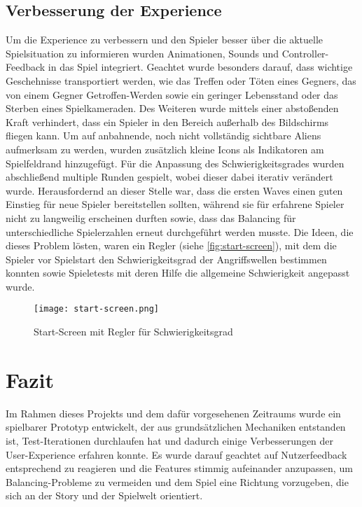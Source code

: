 \documentclass[11pt]{scrartcl}
\begin{document}
\subsection{Verbesserung der Experience}
Um die Experience zu verbessern und den Spieler besser über die aktuelle Spielsituation zu informieren wurden Animationen, Sounds und Controller-Feedback in das Spiel integriert. Geachtet wurde besonders darauf, dass wichtige Geschehnisse transportiert werden, wie das Treffen oder Töten eines Gegners, das von einem Gegner Getroffen-Werden sowie ein geringer Lebensstand oder das Sterben eines Spielkameraden. Des Weiteren wurde mittels einer abstoßenden Kraft verhindert, dass ein Spieler in den Bereich außerhalb des Bildschirms fliegen kann. Um auf anbahnende, noch nicht vollständig sichtbare Aliens aufmerksam zu werden, wurden zusätzlich kleine Icons als Indikatoren am Spielfeldrand hinzugefügt.
Für die Anpassung des Schwierigkeitsgrades wurden abschließend multiple Runden gespielt,
wobei dieser dabei iterativ verändert wurde. Herausfordernd an dieser Stelle war, dass die
ersten Waves einen guten Einstieg für neue Spieler bereitstellen sollten, während sie für
erfahrene Spieler nicht zu langweilig erscheinen durften sowie, dass das Balancing für
unterschiedliche Spielerzahlen erneut durchgeführt werden musste. Die Ideen, die dieses
Problem lösten, waren ein Regler (siehe \autoref{fig:start-screen}), mit dem die Spieler
vor Spielstart den Schwierigkeitsgrad der Angriffswellen bestimmen konnten sowie
Spieletests mit deren Hilfe die allgemeine Schwierigkeit angepasst wurde.

\begin{figure}[htp]
	\centering
	\texttt{[image: start-screen.png]}
	\caption{Start-Screen mit Regler für Schwierigkeitsgrad}
	\label{fig:start-screen}
\end{figure}



\newpage
\section{Fazit}
Im Rahmen dieses Projekts und dem dafür vorgesehenen Zeitraums wurde ein spielbarer
Prototyp entwickelt, der aus grundsätzlichen Mechaniken entstanden ist, Test-Iterationen
durchlaufen hat und dadurch einige Verbesserungen der User-Experience erfahren konnte. Es
wurde darauf geachtet auf Nutzerfeedback entsprechend zu reagieren und die Features
stimmig aufeinander anzupassen, um Balancing-Probleme zu vermeiden und dem Spiel eine
Richtung vorzugeben, die sich an der Story und der Spielwelt orientiert.
\end{document}
